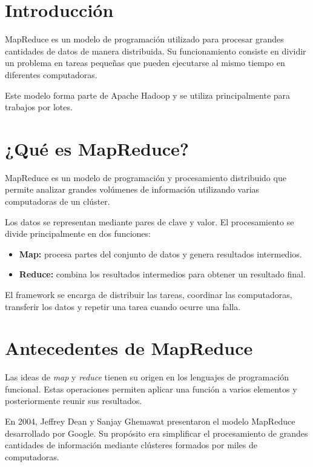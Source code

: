 
\section{Introducción}

MapReduce es un modelo de programación utilizado para procesar grandes
cantidades de datos de manera distribuida. Su funcionamiento consiste en
dividir un problema en tareas pequeñas que pueden ejecutarse al mismo tiempo
en diferentes computadoras.

Este modelo forma parte de Apache Hadoop y se utiliza principalmente para
trabajos por lotes.

\section{¿Qué es MapReduce?}

MapReduce es un modelo de programación y procesamiento distribuido que permite
analizar grandes volúmenes de información utilizando varias computadoras de un
clúster.

Los datos se representan mediante pares de clave y valor. El procesamiento se
divide principalmente en dos funciones:

\begin{itemize}
    \item \textbf{Map:} procesa partes del conjunto de datos y genera resultados
    intermedios.
    \item \textbf{Reduce:} combina los resultados intermedios para obtener un
    resultado final.
\end{itemize}

El framework se encarga de distribuir las tareas, coordinar las computadoras,
transferir los datos y repetir una tarea cuando ocurre una falla.

\section{Antecedentes de MapReduce}

Las ideas de \textit{map} y \textit{reduce} tienen su origen en los lenguajes
de programación funcional. Estas operaciones permiten aplicar una función a
varios elementos y posteriormente reunir sus resultados.

En 2004, Jeffrey Dean y Sanjay Ghemawat presentaron el modelo MapReduce
desarrollado por Google. Su propósito era simplificar el procesamiento de
grandes cantidades de información mediante clústeres formados por miles de
computadoras.

